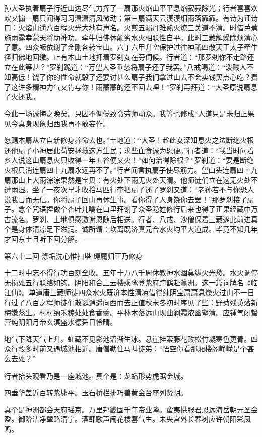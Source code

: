 \documentclass[12pt,UTF8]{ctexbook}
\begin{document}
孙大圣执着扇子行近山边尽气力挥了一扇那火焰山平平息焰寂寂除光；行者喜喜欢欢又搧一扇只闻得习习潇潇清风微动；第三扇满天云漠漠细雨落霏霏。有诗为证诗曰：火焰山遥八百程火光大地有声名。火煎五漏丹难熟火燎三关道不清。时借芭蕉施雨露幸蒙天将助神功。牵牛归佛休颠劣水火相联性自平。此时三藏解燥除烦清心了意。四众皈依谢了金刚各转宝山。六丁六甲升空保护过往神祇四散天王太子牵牛径归佛地回缴。止有本山土地押着罗刹女在旁伺候。行者道：“那罗刹你不走路还立在此等甚？”罗刹跪道：“万望大圣垂慈将扇子还了我罢。”八戒喝道：“泼贱人不知高低！饶了你的性命就彀了还要讨甚么扇子我们拿过山去不会卖钱买点心吃？费了这许多精神力气又肯与你！雨蒙蒙的还不回去哩！”罗刹再拜道：“大圣原说扇息了火还我。

今此一场诚悔之晚矣。只因不倜傥致令劳师动众。我等也修成*人道只是未归正果见今真身现象归西我再不敢妄作。

愿赐本扇从立自新修身养命去也。”土地道：“大圣！趁此女深知息火之法断绝火根还他扇子小神居此苟安拯救这方生民；求些血食诚为恩便。”行者道：“我当时问着乡人说这山扇息火只收得一年五谷便又火！”如何治得除根？”罗刹道：“要是断绝火根只消连扇四十九扇永远再不了。”行者闻言执扇子使尽筋力。望山头连扇四十九扇那山上大雨淙淙果然是宝贝：有火处下雨无火处天晴。他师徒们立在这无火处不遭雨湿。坐了一夜次早才收拾马匹行李把扇子还了罗刹又道：“老孙若不与你恐人说我言而无信。你将扇子回山再休生事。看你得了人身饶你去罢！”那罗刹接了扇子。念个咒语捏做个杏叶儿噙在口里拜谢了众圣隐姓修行后来也得了正果经藏中万古流名。罗刹、土地俱感激谢恩随后相送。行者、八戒、沙僧保着三藏遂此前进真个是身体清凉足下滋润。诚所谓：坎离既济真元合水火均平大道成。毕竟不知几年才回东土且听下回分解。
------------

第六十二回 涤垢洗心惟扫塔 缚魔归正乃修身

十二时中忘不得行功百刻全收。五年十万八千周休教神水涸莫纵火光愁。水火调停无损处五行联络如钩。阴阳和合上云楼乘鸾登紫府跨鹤赴瀛洲。这一篇词牌名《临江仙》。单道唐三藏师徒四众水火既济本性清凉借得纯阴宝扇扇息燥火过山不一日行过了八百之程师徒们散诞逍遥向西而去正值秋末冬初时序见了些：野菊残英落新梅嫩蕊生。村村纳禾稼处处食香羹。平林木落远山现曲涧霜浓幽壑清。应锺气闭蛰营纯阴阳月帝玄溟盛水德舜日怜晴。

地气下降天气上升。虹藏不见影池沼渐生冰。悬崖挂索藤花败松竹凝寒色更青。四众行彀多时前又遇城池相近。唐僧勒住马叫徒弟：“悟空你看那厢楼阁峥嵘是个甚么去处？”

行者抬头观看乃是一座城池。真个是：龙蟠形势虎踞金城。

四垂华盖近百转紫墟平。玉石桥栏排巧兽黄金台座列贤明。

真个是神洲都会天府瑶京。万里邦畿固千年帝业隆。蛮夷拱服君恩远海岳朝元圣会盈。御阶洁净辇路清宁。酒肆歌声闹花楼喜气生。未央宫外长春树应许朝阳彩凤鸣。
\end{document}
